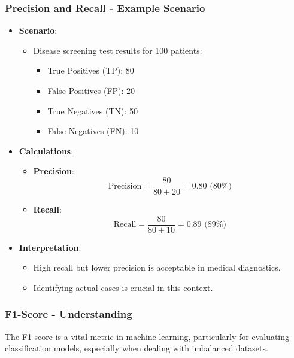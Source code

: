 \documentclass[aspectratio=169]{beamer}
\begin{document}
\begin{frame}[fragile]
    \frametitle{Precision and Recall - Example Scenario}
    \begin{itemize}
        \item \textbf{Scenario}:
        \begin{itemize}
            \item Disease screening test results for 100 patients:
            \begin{itemize}
                \item True Positives (TP): 80
                \item False Positives (FP): 20
                \item True Negatives (TN): 50
                \item False Negatives (FN): 10
            \end{itemize}
        \end{itemize}
        
        \item \textbf{Calculations}:
        \begin{itemize}
            \item \textbf{Precision}:
            \begin{equation}
            \text{Precision} = \frac{80}{80 + 20} = 0.80 \text{ (80\%)}
            \end{equation}
            \item \textbf{Recall}:
            \begin{equation}
            \text{Recall} = \frac{80}{80 + 10} = 0.89 \text{ (89\%)}
            \end{equation}
        \end{itemize}
        
        \item \textbf{Interpretation}:
        \begin{itemize}
            \item High recall but lower precision is acceptable in medical diagnostics.
            \item Identifying actual cases is crucial in this context.
        \end{itemize}
    \end{itemize}
\end{frame}

\begin{frame}[fragile]
    \frametitle{F1-Score - Understanding}

    The F1-score is a vital metric in machine learning, particularly for evaluating classification models, especially when dealing with imbalanced datasets.
\end{frame}
\end{document}
